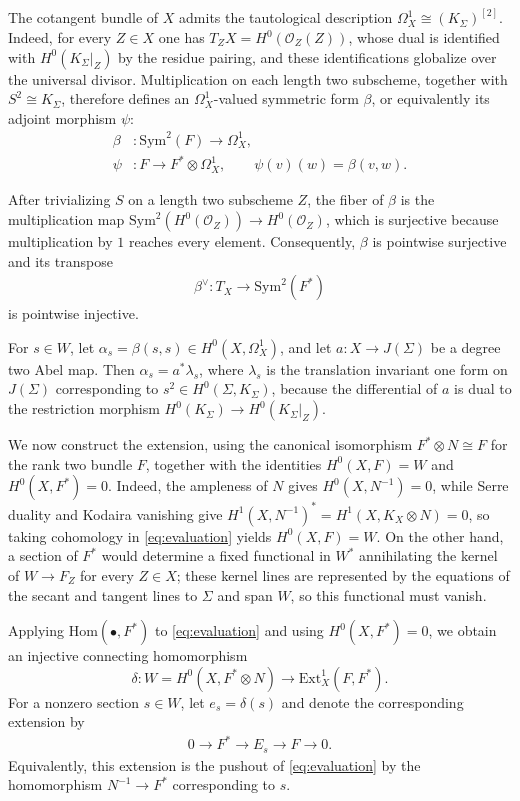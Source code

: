 \documentclass[oneside,11pt]{amsart}
\theoremstyle{definition}
\theoremstyle{remark}
\numberwithin{thm}{section}
\numberwithin{equation}{section}
\begin{document}
The cotangent bundle of $X$ admits the tautological description
$\Omega_X^1\cong(K_\Sigma)^{[2]}$.  Indeed, for every $Z\in X$ one has
$T_ZX=H^0(\mathcal{O}_Z(Z))$, whose dual is identified with
$H^0(K_\Sigma|_Z)$ by the residue pairing, and these identifications
globalize over the universal divisor.  Multiplication on each length two
subscheme, together with $S^2\cong K_\Sigma$, therefore defines an $\Omega_X^1$-valued symmetric form $\beta$, or equivalently its adjoint morphism $\psi$:
\begin{align}
 \beta&:\mathrm{Sym}^2(F)\longrightarrow\Omega_X^1,
 \label{eq:beta}\\
 \psi&:F\longrightarrow F^*\otimes\Omega_X^1,
 \qquad \psi(v)(w)=\beta(v,w).
 \label{eq:psi}
\end{align}

After trivializing $S$ on a length two subscheme $Z$, the fiber of $\beta$ is the multiplication map
$\mathrm{Sym}^2(H^0(\mathcal{O}_Z))\to H^0(\mathcal{O}_Z)$, which is surjective because multiplication by $1$ reaches every element. Consequently, $\beta$ is pointwise surjective and its transpose
\begin{align}\label{eq:tangent-injection}
 \beta^\vee:T_X\longrightarrow\mathrm{Sym}^2(F^*)
\end{align}
is pointwise injective.

For $s\in W$, let $\alpha_s=\beta(s,s)\in H^0(X,\Omega_X^1)$, and let $a:X\to J(\Sigma)$ be a degree two Abel map.  Then $\alpha_s=a^*\lambda_s$, where $\lambda_s$ is the translation invariant one form on $J(\Sigma)$ corresponding to $s^2\in H^0(\Sigma,K_\Sigma)$, because the differential of $a$ is dual to the restriction morphism $H^0(K_\Sigma)\to H^0(K_\Sigma|_Z)$.

We now construct the extension, using the canonical isomorphism
$F^*\otimes N\cong F$ for the rank two bundle $F$, together with the identities $H^0(X,F)=W$ and $H^0(X,F^*)=0$.  Indeed, the ampleness of $N$ gives $H^0(X,N^{-1})=0$, while Serre duality and Kodaira vanishing give $H^1(X,N^{-1})^*=H^1(X,K_X\otimes N)=0$, so taking cohomology in
\eqref{eq:evaluation} yields $H^0(X,F)=W$.  On the other hand, a section of $F^*$ would determine a fixed functional in $W^*$ annihilating the kernel of $W\to F_Z$ for every $Z\in X$; these kernel lines are represented by the equations of the secant and tangent lines to $\Sigma$ and span $W$, so this functional must vanish.

Applying $\mathrm{Hom}(\bullet,F^*)$ to \eqref{eq:evaluation} and using $H^0(X,F^*)=0$, we obtain an injective connecting homomorphism
\[
 \delta:W=H^0(X,F^*\otimes N)
 \longrightarrow\mathrm{Ext}^1_X(F,F^*).
\]
For a nonzero section $s\in W$, let $e_s=\delta(s)$ and denote the corresponding extension by
\begin{align}\label{eq:extension}
 0\longrightarrow F^*\longrightarrow E_s\longrightarrow F
 \longrightarrow0.
\end{align}
Equivalently, this extension is the pushout of \eqref{eq:evaluation} by the homomorphism $N^{-1}\to F^*$ corresponding to $s$.
\end{document}
